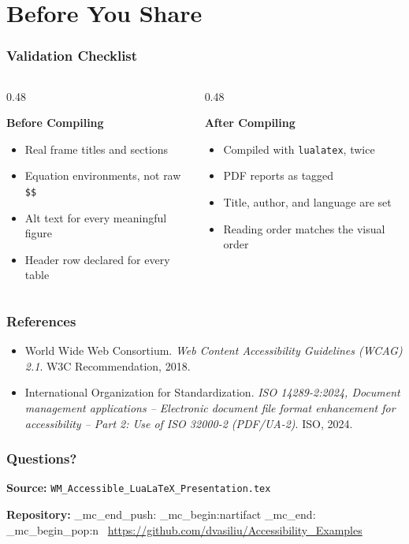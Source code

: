 \documentclass[aspect-ratio=16:9]{ltx-talk}
\newcommand{\wmArtifactText}[1]{%
	\begingroup
	\tag_mc_end_push:
	\tag_mc_begin:n{artifact}
	#1
	\tag_mc_end:
	\tag_mc_begin_pop:n{}
	\endgroup
}
\newcommand{\wmblocktitle}[3]{%
	\par\noindent
	\colorbox{#1}{\parbox{\dimexpr\linewidth-2\fboxsep\relax}{\color{#2}\bfseries\large #3}}%
	\par\vspace{4pt}%
}
\begin{document}
\section{Before You Share}

\begin{frame}
	\frametitle{Validation Checklist}
	\begin{columns}
		\begin{column}{0.48\textwidth}
			\wmblocktitle{WMGold}{black}{Before Compiling}
			\begin{itemize}
				\item Real frame titles and sections
				\item Equation environments, not raw \texttt{\$\$}
				\item Alt text for every meaningful figure
				\item Header row declared for every table
			\end{itemize}
		\end{column}
		\begin{column}{0.48\textwidth}
			\wmblocktitle{WMGold}{black}{After Compiling}
			\begin{itemize}
				\item Compiled with \texttt{lualatex}, twice
				\item PDF reports as tagged
				\item Title, author, and language are set
				\item Reading order matches the visual order
			\end{itemize}
		\end{column}
	\end{columns}
\end{frame}

\begin{frame}
	\frametitle{References}
	\begin{itemize}
		\item World Wide Web Consortium. \emph{Web Content Accessibility Guidelines (WCAG) 2.1}. W3C Recommendation, 2018.
		\item International Organization for Standardization. \emph{ISO 14289-2:2024, Document management applications -- Electronic document file format enhancement for accessibility -- Part 2: Use of ISO 32000-2 (PDF/UA-2)}. ISO, 2024.
	\end{itemize}
\end{frame}

\begin{frame}
	\frametitle{Questions?}
	
	\bigskip
	\textbf{Source:} \texttt{WM\_Accessible\_LuaLaTeX\_Presentation.tex}

	\bigskip
	\textbf{Repository:} \wmArtifactText{\faGithub}\ \url{https://github.com/dvasiliu/Accessibility_Examples}
\end{frame}
\end{document}
